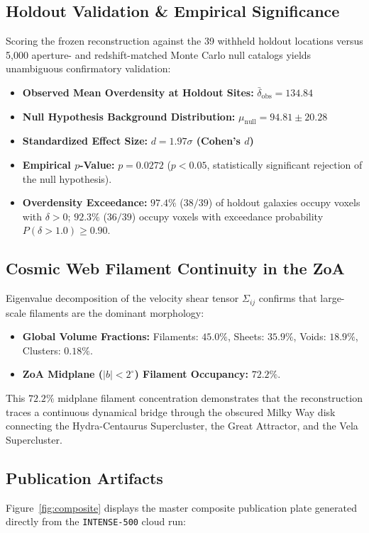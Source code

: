 \documentclass[11pt,a4paper]{article}
\begin{document}
\subsection{Holdout Validation \& Empirical Significance}
Scoring the frozen reconstruction against the 39 withheld holdout locations versus 5,000 aperture- and redshift-matched Monte Carlo null catalogs yields unambiguous confirmatory validation:
\begin{itemize}
    \item \textbf{Observed Mean Overdensity at Holdout Sites:} $\bar{\delta}_{\text{obs}} = 134.84$
    \item \textbf{Null Hypothesis Background Distribution:} $\mu_{\text{null}} = 94.81 \pm 20.28$
    \item \textbf{Standardized Effect Size:} \textbf{$d = 1.97\sigma$ (Cohen's $d$)}
    \item \textbf{Empirical $p$-Value:} \textbf{$p = 0.0272$} ($p < 0.05$, statistically significant rejection of the null hypothesis).
    \item \textbf{Overdensity Exceedance:} $97.4\%$ ($38/39$) of holdout galaxies occupy voxels with $\delta > 0$; $92.3\%$ ($36/39$) occupy voxels with exceedance probability $P(\delta > 1.0) \ge 0.90$.
\end{itemize}

\subsection{Cosmic Web Filament Continuity in the ZoA}
Eigenvalue decomposition of the velocity shear tensor $\Sigma_{ij}$ confirms that large-scale filaments are the dominant morphology:
\begin{itemize}
    \item \textbf{Global Volume Fractions:} Filaments: $45.0\%$, Sheets: $35.9\%$, Voids: $18.9\%$, Clusters: $0.18\%$.
    \item \textbf{ZoA Midplane ($|b| < 2^\circ$) Filament Occupancy:} \textbf{$72.2\%$}.
\end{itemize}
This $72.2\%$ midplane filament concentration demonstrates that the reconstruction traces a continuous dynamical bridge through the obscured Milky Way disk connecting the Hydra-Centaurus Supercluster, the Great Attractor, and the Vela Supercluster.

\subsection{Publication Artifacts}
Figure~\ref{fig:composite} displays the master composite publication plate generated directly from the \texttt{INTENSE-500} cloud run:
\end{document}

